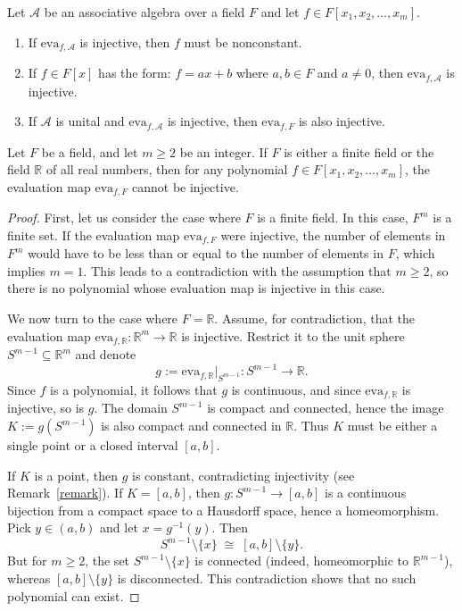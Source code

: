 \documentclass[10pt,a4paper]{amsart}
\begin{document}
	\begin{remark} \label{remark}
		Let $\mathcal{A}$ be an associative algebra over a field $F$ and let $f\in F[x_1,x_2,\ldots,x_m]$.
		\begin{enumerate}[\rm (i)]
			\item If $\mathrm{eva}_{f,\mathcal{A}}$ is injective, then $f$ must be nonconstant. 
			\item If $f\in F[x]$ has the form: $f=ax+b$ where $a,b\in F$ and $a\neq0$, then $\mathrm{eva}_{f,\mathcal{A}}$ is injective.
			\item If $\mathcal{A}$ is unital and $\mathrm{eva}_{f,\mathcal{A}}$ is injective, then $\mathrm{eva}_{f,F}$ is also injective.
		\end{enumerate}
	\end{remark}

	\begin{theorem}\label{variable}
		Let \( F \) be a field, and let \( m \geq 2 \) be an integer. If \( F \) is either a finite field or the field $\mathbb{R}$ of all real numbers, then for any polynomial \( f \in F[x_1, x_2, \ldots, x_m] \), the evaluation map \( \mathrm{eva}_{f,F} \) cannot be injective.
	\end{theorem}

	\begin{proof}
		First, let us consider the case where \( F \) is a finite field. In this case, \( F^m \) is a finite set. If the evaluation map \( \mathrm{eva}_{f,F} \) were injective, the number of elements in \( F^m \) would have to be less than or equal to the number of elements in \( F \), which implies \( m = 1 \). This leads to a contradiction with  the assumption that $m\geq2$, so there is no polynomial whose evaluation map is injective in this case.
		
		We now turn to the case where \( F = \mathbb{R} \).	 Assume, for contradiction, that the evaluation map $\mathrm{eva}_{f,\mathbb{R}} : \mathbb{R}^m \to \mathbb{R}$ is injective. Restrict it to the unit sphere $S^{m-1} \subseteq \mathbb{R}^m$ and denote
		\[
		g := \mathrm{eva}_{f,\mathbb{R}}|_{S^{m-1}} : S^{m-1} \to \mathbb{R}.
		\]
		Since $f$ is a polynomial, it follows that $g$ is continuous, and since $\mathrm{eva}_{f,\mathbb{R}}$ is injective, so is $g$. The domain $S^{m-1}$ is compact and connected, hence the image 
		$K := g(S^{m-1})$ is also compact and connected in $\mathbb{R}$. Thus $K$ must be either a single point or a closed interval $[a,b]$.
		
		If $K$ is a point, then $g$ is constant, contradicting injectivity (see Remark~\ref{remark}). 
		If $K=[a,b]$, then $g : S^{m-1} \to [a,b]$ is a continuous bijection from a compact space to a Hausdorff space, hence a homeomorphism. 
		Pick $y \in (a,b)$ and let $x = g^{-1}(y)$. Then
		\[
		S^{m-1}\setminus \{x\} \;\cong\; [a,b]\setminus \{y\}.
		\]
		But for $m\geq 2$, the set $S^{m-1}\setminus\{x\}$ is connected 
		(indeed, homeomorphic to $\mathbb{R}^{m-1}$), 
		whereas $[a,b]\setminus\{y\}$ is disconnected. 
		This contradiction shows that no such polynomial can exist.
	\end{proof}
\end{document}
